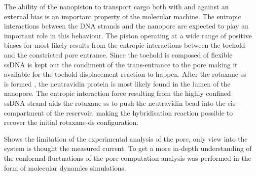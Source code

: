 The ability of the nanopiston to transport cargo both with and against an external bias
is an important property of the molecular machine. The entropic interactions between the
DNA strands and the nanopore are expected to play an important role in this behaviour.
The piston operating at a wide range of positive biases for most likely results from the
entropic interactions between the toehold and the constricted pore entrance.  Since the
toehold is composed of flexible ssDNA is kept out the condiment of the trans-entrance to
the pore making it available for the toehold displacement reaction to happen.
After the rotaxane-ss is formed , the neutravidin protein is most likely found in the
lumen of the nanopore. The entropic interaction force resulting from the highly confined
ssDNA strand aids the rotaxane-ss to push the neutravidin bead into the cis-compartment
of the reservoir, making the hybridisation reaction possible to recover the initial
rotaxane-ds configuration.

Shows the limitation of the experimental analysis of the pore, only view into the system
is thought the measured current. To get a more in-depth understanding of the conformal
fluctuations of the pore  computation analysis was performed in the form of molecular
dynamics simulations.








